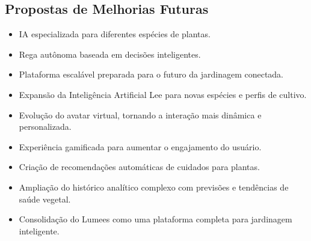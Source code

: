 \documentclass[
	12pt,
	article,
	oneside,
	a4paper,
	english,
	brazil
	]{abntex2}
\begin{document}
\subsection{Propostas de Melhorias Futuras}
\begin{itemize}
    \item IA especializada para diferentes espécies de plantas.
    \item Rega autônoma baseada em decisões inteligentes.
    \item Plataforma escalável preparada para o futuro da jardinagem conectada.
    \item Expansão da Inteligência Artificial Lee para novas espécies e perfis de cultivo.
    \item Evolução do avatar virtual, tornando a interação mais dinâmica e personalizada.
    \item Experiência gamificada para aumentar o engajamento do usuário.
    \item Criação de recomendações automáticas de cuidados para plantas.
    \item Ampliação do histórico analítico complexo com previsões e tendências de saúde vegetal.
    \item Consolidação do Lumees como uma plataforma completa para jardinagem inteligente.
\end{itemize}






\postextual


\end{document}
